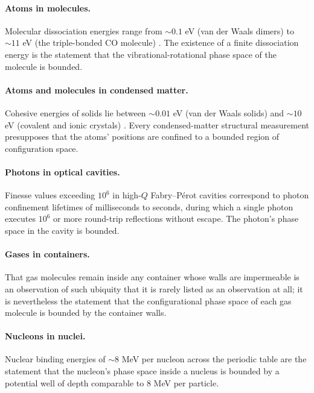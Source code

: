 \documentclass[11pt,twocolumn,a4paper]{article}
\theoremstyle{axiomstyle}
\theoremstyle{conseqstyle}
\theoremstyle{definition}
\theoremstyle{remark}
\begin{document}
\paragraph{Atoms in molecules.} Molecular dissociation energies range from $\sim 0.1$ eV (van der Waals dimers) to $\sim 11$ eV (the triple-bonded CO molecule) \citep{wilsondeciuscross1955}. The existence of a finite dissociation energy is the statement that the vibrational-rotational phase space of the molecule is bounded.

\paragraph{Atoms and molecules in condensed matter.} Cohesive energies of solids lie between $\sim 0.01$ eV (van der Waals solids) and $\sim 10$ eV (covalent and ionic crystals) \citep{ashcroftmermin1976}. Every condensed-matter structural measurement presupposes that the atoms' positions are confined to a bounded region of configuration space.

\paragraph{Photons in optical cavities.} Finesse values exceeding $10^{6}$ in high-$Q$ Fabry--P\'erot cavities correspond to photon confinement lifetimes of milliseconds to seconds, during which a single photon executes $10^{6}$ or more round-trip reflections without escape. The photon's phase space in the cavity is bounded.

\paragraph{Gases in containers.} That gas molecules remain inside any container whose walls are impermeable is an observation of such ubiquity that it is rarely listed as an observation at all; it is nevertheless the statement that the configurational phase space of each gas molecule is bounded by the container walls.

\paragraph{Nucleons in nuclei.} Nuclear binding energies of $\sim 8$ MeV per nucleon across the periodic table \citep{audi2017,krane1988} are the statement that the nucleon's phase space inside a nucleus is bounded by a potential well of depth comparable to $8$ MeV per particle.
\end{document}
